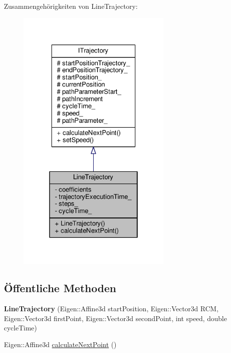 Zusammengehörigkeiten von Line\-Trajectory\-:
\nopagebreak
\begin{figure}[H]
\begin{center}
\leavevmode
\includegraphics[width=214pt]{classLineTrajectory__coll__graph}
\end{center}
\end{figure}
\subsection*{Öffentliche Methoden}
\begin{DoxyCompactItemize}
\item 
\hypertarget{classLineTrajectory_a4d872310cac1add21fe99132f8ed596e}{{\bfseries Line\-Trajectory} (Eigen\-::\-Affine3d start\-Position, Eigen\-::\-Vector3d R\-C\-M, Eigen\-::\-Vector3d first\-Point, Eigen\-::\-Vector3d second\-Point, int speed, double cycle\-Time)}\label{classLineTrajectory_a4d872310cac1add21fe99132f8ed596e}

\item 
Eigen\-::\-Affine3d \hyperlink{classLineTrajectory_a94cbb5d8561ef9ea107b9faf8db89df5}{calculate\-Next\-Point} ()
\end{DoxyCompactItemize}
